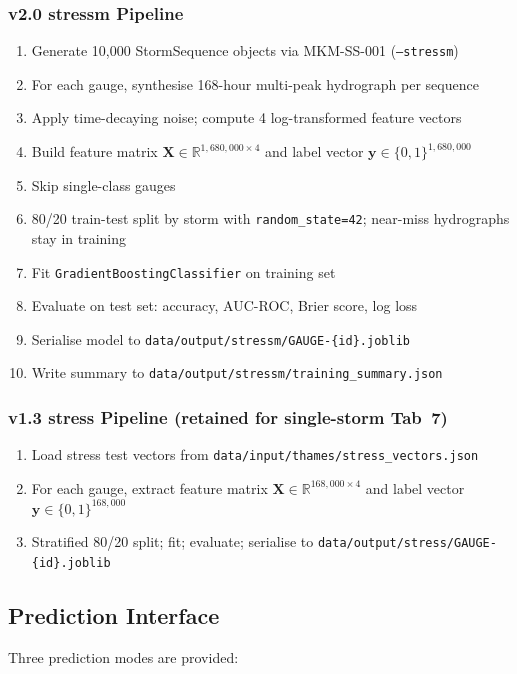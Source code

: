 \documentclass[11pt,a4paper]{article}
\begin{document}
\subsubsection{v2.0 stressm Pipeline}
\begin{enumerate}[nosep]
    \item Generate 10{,}000 StormSequence objects via MKM-SS-001 (\texttt{--stressm})
    \item For each gauge, synthesise 168-hour multi-peak hydrograph per sequence
    \item Apply time-decaying noise; compute 4 log-transformed feature vectors
    \item Build feature matrix $\mathbf{X} \in \mathbb{R}^{1{,}680{,}000 \times 4}$
          and label vector $\mathbf{y} \in \{0,1\}^{1{,}680{,}000}$
    \item Skip single-class gauges
    \item 80/20 train-test split by storm with \texttt{random\_state=42};
          near-miss hydrographs stay in training
    \item Fit \texttt{GradientBoostingClassifier} on training set
    \item Evaluate on test set: accuracy, AUC-ROC, Brier score, log loss
    \item Serialise model to \texttt{data/output/stressm/GAUGE-\{id\}.joblib}
    \item Write summary to \texttt{data/output/stressm/training\_summary.json}
\end{enumerate}

\subsubsection{v1.3 stress Pipeline (retained for single-storm Tab~7)}
\begin{enumerate}[nosep]
    \item Load stress test vectors from \texttt{data/input/thames/stress\_vectors.json}
    \item For each gauge, extract feature matrix $\mathbf{X} \in \mathbb{R}^{168{,}000 \times 4}$
          and label vector $\mathbf{y} \in \{0,1\}^{168{,}000}$
    \item Stratified 80/20 split; fit; evaluate; serialise to
          \texttt{data/output/stress/GAUGE-\{id\}.joblib}
\end{enumerate}

\subsection{Prediction Interface}
Three prediction modes are provided:
\end{document}
